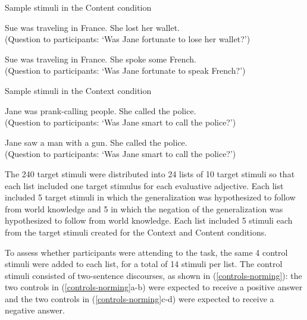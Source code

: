 \documentclass[11pt,fleqn]{article}
\newcommand{\6}{\mbox{$[\hspace*{-.6mm}[$}}
\newcommand{\9}{\mbox{$]\hspace*{-.6mm}]$}}
\begin{document}
\begin{exe}
\ex\label{cont-norm} Sample stimuli in the Content condition 

\begin{xlist}
\ex Sue was traveling in France. She lost her wallet. \\ (Question to  participants: `Was Jane fortunate to lose her wallet?')

\ex Sue was traveling in France. She spoke some French. \\ (Question to participants: `Was Jane fortunate to speak French?')

\end{xlist}

\ex\label{context-norm} Sample stimuli in the Context condition

\begin{xlist}
\ex Jane was prank-calling people. She called the police. \\ (Question to participants: `Was Jane smart to call the police?')

\ex Jane saw a man with a gun. She called the police. \\ (Question to participants: `Was Jane smart to call the police?')
\end{xlist}
\end{exe}

The 240 target stimuli were distributed into 24 lists of 10 target stimuli so that each list included one target stimulus for each evaluative adjective. Each list included 5 target stimuli in which the generalization was hypothesized to follow from world knowledge and 5 in which the negation of the generalization was hypothesized to follow from world knowledge. Each list included 5 stimuli each from the target stimuli created for the Context and Content conditions.

To assess whether participants were attending to the task, the same 4 control stimuli were added to each list, for a total of 14 stimuli per list. The control stimuli consisted of two-sentence discourses, as shown in (\ref{controls-norming}): the two controls in (\ref{controls-norming}a-b) were expected to receive a positive answer and the two controls in (\ref{controls-norming}c-d) were expected to receive a negative answer.
\end{document}
